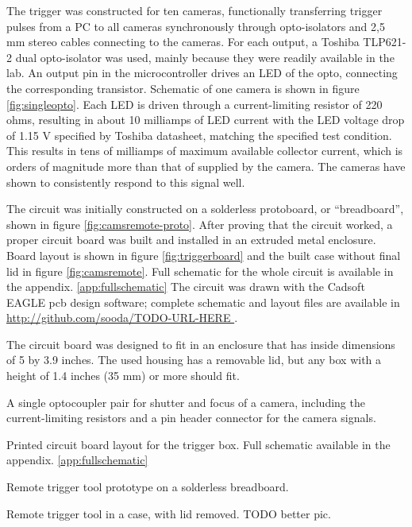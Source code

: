 The trigger was constructed for ten cameras, functionally transferring trigger pulses from a PC to all cameras synchronously through opto-isolators and 2,5 mm stereo cables connecting to the cameras.
For each output, a Toshiba TLP621-2 dual opto-isolator was used, mainly because they were readily available in the lab.
An output pin in the microcontroller drives an LED of the opto, connecting the corresponding transistor.
Schematic of one camera is shown in figure \ref{fig:singleopto}.
Each LED is driven through a current-limiting resistor of 220 ohms, resulting in about 10 milliamps of LED current with the LED voltage drop of 1.15 V specified by Toshiba datasheet, matching the specified test condition.
This results in tens of milliamps of maximum available collector current, which is orders of magnitude more than that of supplied by the camera. %
The cameras have shown to consistently respond to this signal well.

The circuit was initially constructed on a solderless protoboard, or ``breadboard'', shown in figure \ref{fig:camsremote-proto}.
After proving that the circuit worked, a proper circuit board was built and installed in an extruded metal enclosure.
Board layout is shown in figure \ref{fig:triggerboard} and the built case without final lid in figure \ref{fig:camsremote}.
Full schematic for the whole circuit is available in the appendix. \ref{app:fullschematic}
The circuit was drawn with the Cadsoft EAGLE pcb design software; complete schematic and layout files are available in \url { http://github.com/sooda/TODO-URL-HERE }.

The circuit board was designed to fit in an enclosure that has inside dimensions of 5 by 3.9 inches.
The used housing has a removable lid, but any box with a height of 1.4 inches (35 mm) or more should fit.

{A single optocoupler pair for shutter and focus of a camera, including the current-limiting resistors and a pin header connector for the camera signals.}

{Printed circuit board layout for the trigger box. Full schematic available in the appendix. \ref{app:fullschematic}}

{Remote trigger tool prototype on a solderless breadboard.}

{Remote trigger tool in a case, with lid removed. TODO better pic.}

